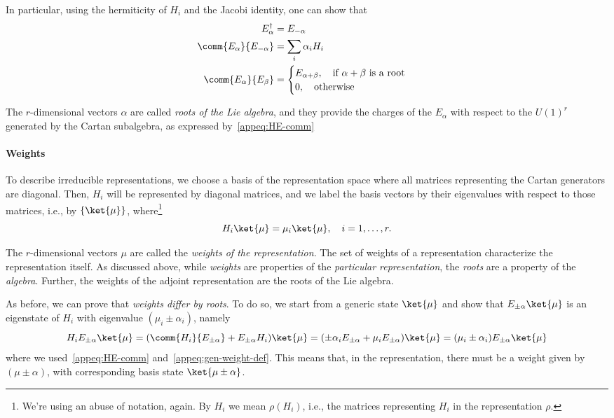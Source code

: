 In particular, using the hermiticity of $H_i$ and the Jacobi identity, one can show that
\begin{subequations}
\begin{align}
    E^\dagger_\alpha &= E_{-\alpha} \\
    \comm{E_\alpha}{E_{-\alpha}} &= \sum_i \alpha_i H_i \label{eq:prop-1}\\
    \comm{E_\alpha}{E_\beta} &= \begin{cases}
        E_{\alpha + \beta}, \quad \textup{if $\alpha + \beta$ is a root} \\
        0, \quad \textup{otherwise}
    \end{cases}
\end{align}
\end{subequations}

The $r$-dimensional vectors $\alpha$ are called \emph{roots of the Lie algebra}, and they provide the charges of the $E_\alpha$ with respect to the $U(1)^r$ generated by the Cartan subalgebra, as expressed by~\eqref{appeq:HE-comm}

\paragraph{Weights}
To describe irreducible representations, we choose a basis of the representation space where all matrices representing the Cartan generators are diagonal. Then, $H_i$ will be represented by diagonal matrices, and we label the basis vectors by their eigenvalues with respect to those matrices, i.e., by $\{\ket{\mu}\}$, where\footnote{We're using an abuse of notation, again. By $H_i$ we mean $\rho(H_i)$, i.e., the matrices representing $H_i$ in the representation $\rho$.}
\begin{equation}\label{appeq:gen-weight-def}
    H_i \ket{\mu} = \mu_i \ket{\mu}, \quad i = 1, \dots, r.
\end{equation}

The $r$-dimensional vectors $\mu$ are called the \emph{weights of the representation}. The set of weights of a representation characterize the representation itself. As discussed above, while \emph{weights} are properties of the \emph{particular representation}, the \emph{roots} are a property of the \emph{algebra}. Further, the weights of the adjoint representation are the roots of the Lie algebra.

As before, we can prove that \emph{weights differ by roots}. To do so, we start from a generic state $\ket{\mu}$ and show that $E_{\pm \alpha}\ket{\mu}$ is an eigenstate of $H_i$ with eigenvalue $(\mu_i \pm \alpha_i)$, namely
\begin{equation}
    H_i E_{\pm \alpha} \ket{\mu} = ( \comm{H_i}{E_{\pm \alpha}} + E_{\pm \alpha} H_i )\ket{\mu} = ( \pm \alpha_i E_{\pm \alpha} + \mu_i E_{\pm \alpha} )\ket{\mu} = ( \mu_i \pm \alpha_i )E_{\pm\alpha}\ket{\mu}
\end{equation}
where we used~\eqref{appeq:HE-comm} and~\eqref{appeq:gen-weight-def}. This means that, in the representation, there must be a weight given by $(\mu \pm \alpha)$, with corresponding basis state $\ket{\mu \pm \alpha}$.

